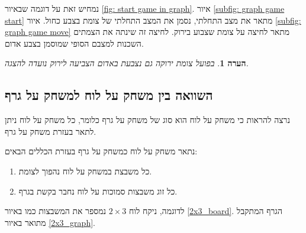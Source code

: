 \documentclass[12pt,leqno]{article}
\theoremstyle{theoremdd}
\newtheorem{comm}{הערה}[section]
\begin{document}
נמחיש זאת על דוגמה שבאיור
\ref{fig: start game in graph}.
איור 
\ref{subfig: graph game start}
מתאר את מצב התחלתי, נסמן את המצב התחלתי של צומת בצבע כחול.
איור
\ref{subfig: graph game move}
מתאר לחיצה על צומת שצבוע בירוק.
לחיצה זה שינתה את הצמתים השכנות למצבם הסופי שמוסמן בצבע אדום.
\begin{comm}
    בפועל צומת ירוקה גם נצבעת באדום הצביעה לירוק נועדה להצגה.
\end{comm}

\subsection{השוואה בין משחק על לוח למשחק על גרף}
נרצה להראות כי משחק על לוח הוא סוג של משחק על גרף
כלומר, כל משחק על לוח ניתן לתאר בעזרת משחק על גרף.

נתאר משחק על לוח כמשחק על גרף בעזרת הכללים הבאים:
\begin{enumerate}
    \item 
    כל משבצת במשחק על לוח נהפוך לצומת.
    \item 
    כל זוג משבצות סמוכות על לוח נחבר בקשת בגרף.
\end{enumerate}

לדוגמה, ניקח לוח
$2 \times 3$
נמספר את המשבצות כמו באיור
\ref{2x3_board}.
הגרף המתקבל מתואר באיור
\ref{2x3_graph}.
\end{document}
